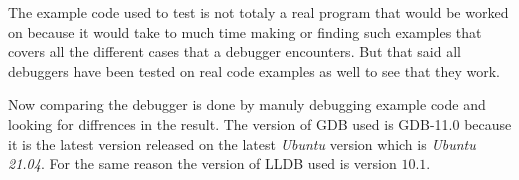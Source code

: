 
The example code used to test is not totaly a real program that would be worked on because it would take to much time making or finding such examples that covers all the different cases that a debugger encounters.
But that said all debuggers have been tested on real code examples as well to see that they work.


Now comparing the debugger is done by manuly debugging example code \cite{debugexample} and looking for diffrences in the result.
The version of \gls{GDB} used is \gls{GDB}-11.0 because it is the latest version released on the latest \emph{Ubuntu} version which is \emph{Ubuntu 21.04}.
For the same reason the version of \gls{LLDB} used is version $10.1$.


